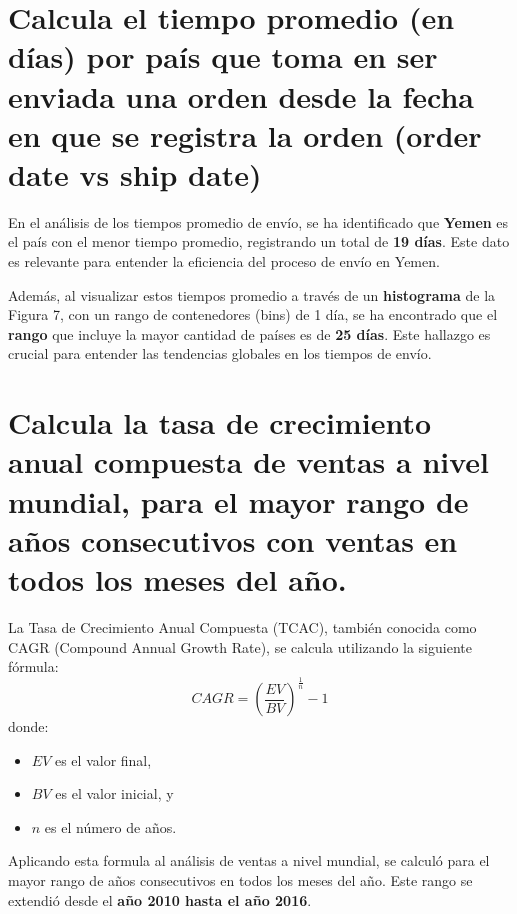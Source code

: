 \documentclass[10pt]{article}
\begin{document}
\begin{paracol}{2}
\section{Calcula el tiempo promedio (en días) por país que toma en ser enviada una orden desde la fecha en que se registra la orden (order date vs ship date)}
\switchcolumn[0]\noindent
En el análisis de los tiempos promedio de envío, se ha identificado que \textbf{Yemen} es el país con el menor tiempo promedio, registrando un total de \textbf{19 días}. Este dato es relevante para entender la eficiencia del proceso de envío en Yemen.

Además, al visualizar estos tiempos promedio a través de un \textbf{histograma} de la Figura 7, con un rango de contenedores (bins) de 1 día, se ha encontrado que el \textbf{rango} que incluye la mayor cantidad de países es de \textbf{25 días}. Este hallazgo es crucial para entender las tendencias globales en los tiempos de envío.


\section{Calcula la tasa de crecimiento anual compuesta de ventas a nivel mundial, para el mayor rango de años consecutivos con ventas en todos los meses del año.}
La Tasa de Crecimiento Anual Compuesta (TCAC), también conocida como CAGR (Compound Annual Growth Rate), se calcula utilizando la siguiente fórmula:
$$
CAGR = \left( \frac{EV}{BV} \right)^{\frac{1}{n}} - 1
$$
donde:
\begin{itemize}
    \item $EV$ es el valor final,
    \item $BV$ es el valor inicial, y
    \item $n$ es el número de años.
\end{itemize}
\vspace{0.2cm}
Aplicando esta formula al análisis de ventas a nivel mundial, se calculó para el mayor rango de años consecutivos en todos los meses del año. Este rango se extendió desde el \textbf{año 2010 hasta el año 2016}.


\end{paracol}
\end{document}
